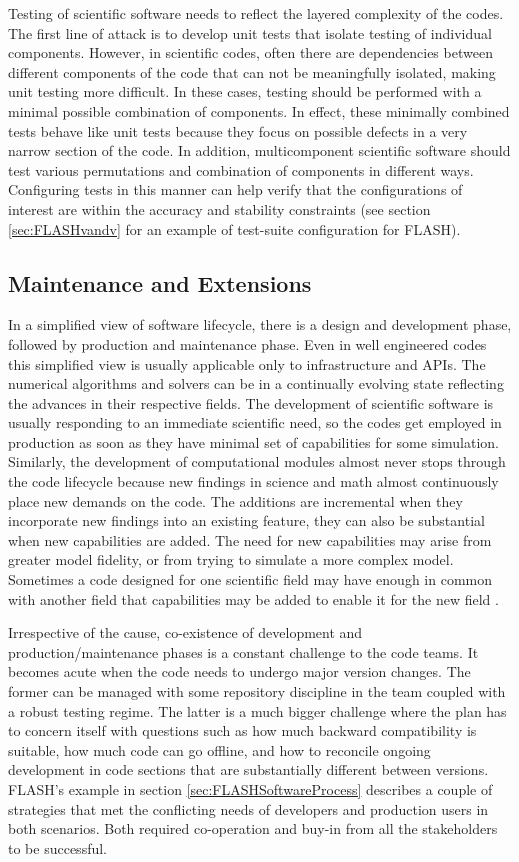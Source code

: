 Testing of scientific software needs to reflect the layered complexity of
the codes. The first line of attack is to develop 
unit tests that isolate testing of individual components. However, in
scientific codes, often there are dependencies between 
different components of the code that can not be meaningfully
isolated, making unit testing more difficult. In these cases, testing
should be performed with a minimal possible combination of components.  In
effect, these minimally combined tests behave like unit tests because they focus on possible
defects in a very narrow section of the code. In addition,
multicomponent scientific software should test various  permutations and
combination of components in different ways. Configuring tests in this
manner can help verify that the configurations of interest are within the
accuracy and stability constraints (see section
\ref{sec:FLASHvandv} for an example of test-suite configuration for FLASH).   

\subsection{Maintenance and Extensions}
\label{sec:maintain}
In a simplified view of software lifecycle, there is a design and development phase,
followed by production and maintenance phase.  Even in well engineered
codes this simplified view is usually applicable only to 
infrastructure and APIs. The numerical 
algorithms and solvers can be in a continually evolving state
reflecting the advances in their respective fields.  
The development of scientific software is usually responding to an immediate
scientific need, so the codes get employed in production as soon as
they have minimal set of capabilities for some simulation.  Similarly, the development of computational
modules almost never stops through the code lifecycle because new
findings in science and math almost continuously place new demands on
the code. The additions are incremental when they incorporate new
findings into an existing feature, they can also be substantial when
new capabilities are added. The need for new capabilities may arise
from  greater model fidelity, or from trying to simulate a more
complex model. Sometimes a code designed for one scientific field may
have enough in common with another field that capabilities may be
added to enable it for the new field \cite{Dubey2016Pasc}.    

Irrespective of the cause, co-existence of development and
production/maintenance phases is a constant challenge to the code
teams. It becomes acute when the code needs to undergo major version
changes. The former can be managed with some repository
discipline in the team coupled with a robust testing regime. The latter
is a much bigger challenge where the plan has to concern itself with
questions such as how much backward compatibility is suitable, how
much code can go offline, and how to reconcile ongoing development in
code sections that are substantially different between versions.
FLASH's example in section \ref{sec:FLASHSoftwareProcess} describes
a couple of strategies that met the conflicting needs of developers and
production users in both scenarios. Both required co-operation and
buy-in from all the stakeholders to be successful. 


